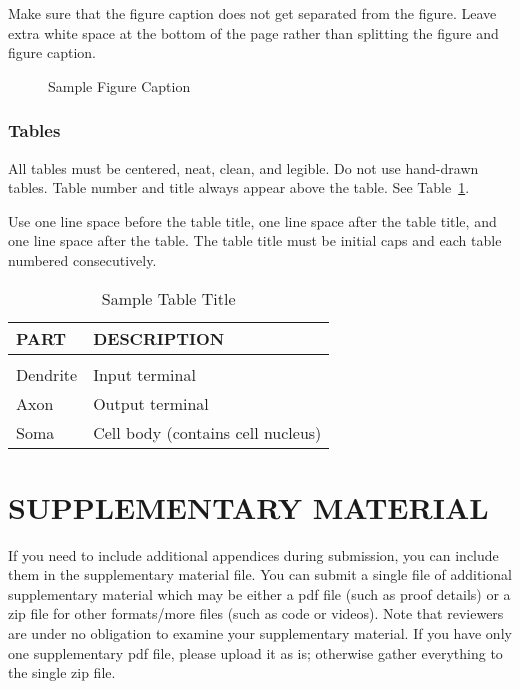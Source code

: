 \documentclass[twoside]{article}
\begin{document}
Make sure that the figure caption does not get separated from the
figure. Leave extra white space at the bottom of the page rather than
splitting the figure and figure caption.
\begin{figure}[h]
\vspace{.3in}
\centerline{}
\vspace{.3in}
\caption{Sample Figure Caption}
\end{figure}

\subsubsection{Tables}

All tables must be centered, neat, clean, and legible. Do not use hand-drawn tables.
Table number and title always appear above the table.
See Table~\ref{sample-table}.

Use one line space before the table title, one line space after the table title,
and one line space after the table. The table title must be
initial caps and each table numbered consecutively.

\begin{table}[h]
\caption{Sample Table Title} \label{sample-table}
\begin{center}
\begin{tabular}{ll}
\textbf{PART}  &\textbf{DESCRIPTION} \\
\hline \\
Dendrite         &Input terminal \\
Axon             &Output terminal \\
Soma             &Cell body (contains cell nucleus) \\
\end{tabular}
\end{center}
\end{table}

\section{SUPPLEMENTARY MATERIAL}

If you need to include additional appendices during submission, you can include them in the supplementary material file.
You can submit a single file of additional supplementary material which may be either a pdf file (such as proof details) or a zip file for other formats/more files (such as code or videos). 
Note that reviewers are under no obligation to examine your supplementary material. 
If you have only one supplementary pdf file, please upload it as is; otherwise gather everything to the single zip file.
\end{document}
